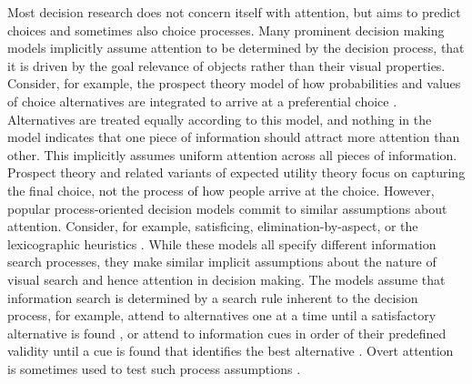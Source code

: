 Most decision research does not concern itself with attention, but aims to predict choices and sometimes also choice processes. Many prominent decision making models implicitly assume attention to be determined by the decision process, that it is driven by the goal relevance of objects rather than their visual properties. Consider, for example, the prospect theory model of how probabilities and values of choice alternatives are integrated to arrive at a preferential choice \citep{tversky1979}. Alternatives are treated equally according to this model, and nothing in the model indicates that one piece of information should attract more attention than other. This implicitly assumes uniform attention across all pieces of information. Prospect theory and related variants of expected utility theory focus on capturing the final choice, not the process of how people arrive at the choice. However, popular process-oriented decision models commit to similar assumptions about attention. Consider, for example, satisficing, elimination-by-aspect, or the lexicographic heuristics \citep{payne1988, simon1956a}. While these models all specify different information search processes, they make similar implicit assumptions about the nature of visual search and hence attention in decision making. The models assume that information search is determined by a search rule inherent to the decision process, for example, attend to alternatives one at a time until a satisfactory alternative is found \citep{stuttgen2012}, or attend to information cues in order of their predefined validity until a cue is found that identifies the best alternative \citep{krefeld-schwalb2019a}. Overt attention is sometimes used to test such process assumptions \citep{gloeckner2011a}.\\ 

